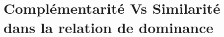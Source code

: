\documentclass[a4paper, 11pt]{book}
\begin{document}
	

%	
%	
\chapter{Complémentarité Vs Similarité dans la relation de dominance}

	
	\label{chap:dec}
	
	
\end{document}
